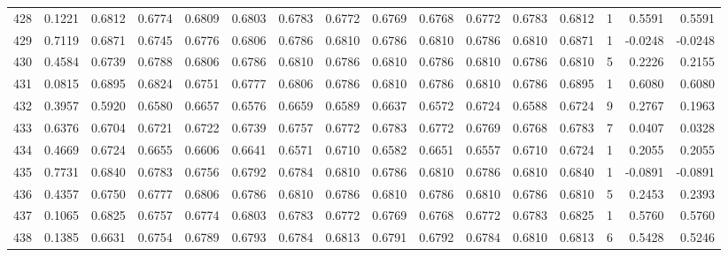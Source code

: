 \begin{tabular}{lrrrrrrrrrrrrrrr}
428 &      0.1221 &  0.6812 &  0.6774 &  0.6809 &  0.6803 &  0.6783 &  0.6772 &  0.6769 &  0.6768 &  0.6772 &   0.6783 &     0.6812 &      1 &                    0.5591 &                     0.5591 \\
429 &      0.7119 &  0.6871 &  0.6745 &  0.6776 &  0.6806 &  0.6786 &  0.6810 &  0.6786 &  0.6810 &  0.6786 &   0.6810 &     0.6871 &      1 &                   -0.0248 &                    -0.0248 \\
430 &      0.4584 &  0.6739 &  0.6788 &  0.6806 &  0.6786 &  0.6810 &  0.6786 &  0.6810 &  0.6786 &  0.6810 &   0.6786 &     0.6810 &      5 &                    0.2226 &                     0.2155 \\
431 &      0.0815 &  0.6895 &  0.6824 &  0.6751 &  0.6777 &  0.6806 &  0.6786 &  0.6810 &  0.6786 &  0.6810 &   0.6786 &     0.6895 &      1 &                    0.6080 &                     0.6080 \\
432 &      0.3957 &  0.5920 &  0.6580 &  0.6657 &  0.6576 &  0.6659 &  0.6589 &  0.6637 &  0.6572 &  0.6724 &   0.6588 &     0.6724 &      9 &                    0.2767 &                     0.1963 \\
433 &      0.6376 &  0.6704 &  0.6721 &  0.6722 &  0.6739 &  0.6757 &  0.6772 &  0.6783 &  0.6772 &  0.6769 &   0.6768 &     0.6783 &      7 &                    0.0407 &                     0.0328 \\
434 &      0.4669 &  0.6724 &  0.6655 &  0.6606 &  0.6641 &  0.6571 &  0.6710 &  0.6582 &  0.6651 &  0.6557 &   0.6710 &     0.6724 &      1 &                    0.2055 &                     0.2055 \\
435 &      0.7731 &  0.6840 &  0.6783 &  0.6756 &  0.6792 &  0.6784 &  0.6810 &  0.6786 &  0.6810 &  0.6786 &   0.6810 &     0.6840 &      1 &                   -0.0891 &                    -0.0891 \\
436 &      0.4357 &  0.6750 &  0.6777 &  0.6806 &  0.6786 &  0.6810 &  0.6786 &  0.6810 &  0.6786 &  0.6810 &   0.6786 &     0.6810 &      5 &                    0.2453 &                     0.2393 \\
437 &      0.1065 &  0.6825 &  0.6757 &  0.6774 &  0.6803 &  0.6783 &  0.6772 &  0.6769 &  0.6768 &  0.6772 &   0.6783 &     0.6825 &      1 &                    0.5760 &                     0.5760 \\
438 &      0.1385 &  0.6631 &  0.6754 &  0.6789 &  0.6793 &  0.6784 &  0.6813 &  0.6791 &  0.6792 &  0.6784 &   0.6810 &     0.6813 &      6 &                    0.5428 &                     0.5246 \\

\end{tabular}

